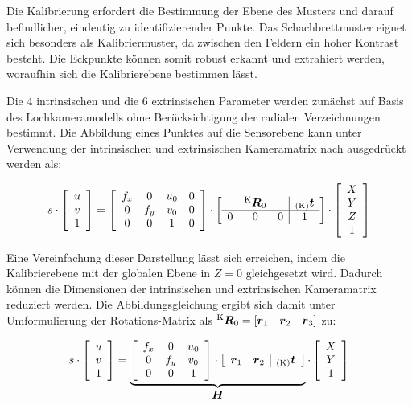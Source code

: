 Die Kalibrierung erfordert die Bestimmung der Ebene des Musters und darauf befindlicher, eindeutig zu identifizierender Punkte. Das Schachbrettmuster eignet sich besonders als Kalibriermuster, da zwischen den Feldern ein hoher Kontrast besteht. Die Eckpunkte können somit robust erkannt und extrahiert werden, woraufhin sich die Kalibrierebene bestimmen lässt.\\


Die 4 intrinsischen und die 6 extrinsischen Parameter werden zunächst auf Basis des Lochkameramodells ohne Berücksichtigung der radialen Verzeichnungen bestimmt. Die Abbildung eines Punktes auf die Sensorebene kann unter Verwendung der intrinsischen und extrinsischen Kameramatrix nach  ausgedrückt werden als:

\begin{equation}
s \cdot 
\mat{c}{
u\\
v\\
1
}
=
\mat{cccc}{
f_x & 0 & u_\ind{0} & 0\\
0 & f_y & v_\ind{0} & 0\\
0 & 0 & 1 & 0
}
\cdot
\mat{ccc|c}{
  & \rmat{K}{0} &   & \ve{K}{t} \\
\hline
0 &      0      & 0 & 1 \\
}
\cdot
\mat{c}{
X\\
Y\\
Z\\
1
}
\end{equation}

Eine Vereinfachung dieser Darstellung lässt sich erreichen, indem die Kalibrierebene mit der globalen Ebene in $Z=0$ gleichgesetzt wird. Dadurch können die Dimensionen der intrinsischen und extrinsischen Kameramatrix reduziert werden. Die Abbildungsgleichung ergibt sich damit unter Umformulierung der Rotations-Matrix als $\rmat{K}{0} = [\vec{r}_1 \quad \vec{r}_2 \quad \vec{r}_3]$ zu:


\begin{equation}
s \cdot
\mat{c}{
u\\
v\\
1
}
 = 
\underbrace{
\mat{ccc}{ 
	f_x & 0 & u_\ind{0}\\
	0 & f_y & v_\ind{0}\\
	0 & 0 & 1
}
\cdot
\mat{cc|c}{ 
	\vec{r}_1 & \vec{r}_2 & \ve{K}{t} \\
}
}_{\vec{H}}
\cdot
\mat{c}{
	X\\
	Y\\
	1
}
\end{equation}


